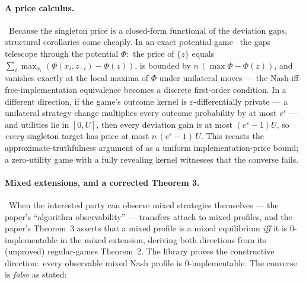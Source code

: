 
\paragraph{A price calculus.}\
Because the singleton price is a closed-form functional of the
deviation gaps, structural corollaries come cheaply.  In an exact
potential game~\citep{MondererShapley1996} the gaps telescope through
the potential $\Phi$:\ the price of $\{z\}$ equals
$\sum_i \max_{x_i} (\Phi(x_i,z_{-i}) - \Phi(z))$, is bounded by
$n\,(\max \Phi - \Phi(z))$, and vanishes exactly at the local maxima
of $\Phi$ under unilateral moves — the Nash-iff-free-implementation
equivalence becomes a discrete first-order condition.  In a different
direction, if the game's outcome kernel is
$\varepsilon$-differentially private — a unilateral strategy change
multiplies every outcome probability by at most $e^{\varepsilon}$ —
and utilities lie in $[0,U]$, then every deviation gain is at most
$(e^{\varepsilon}-1)U$, so \emph{every} singleton target has price at
most $n\,(e^{\varepsilon}-1)\,U$.  This recasts the
approximate-truthfulness argument of
\citet{McSherryTalwar2007} as a uniform implementation-price bound; a
zero-utility game with a fully revealing kernel witnesses that the
converse fails.


\paragraph{Mixed extensions, and a corrected Theorem 3.}\
When the interested party can observe mixed strategies themselves —
the paper's ``algorithm observability'' — transfers attach to mixed
profiles, and the paper's Theorem~3 asserts that a mixed profile is a
mixed equilibrium \emph{iff} it is 0-implementable in the mixed
extension, deriving both directions from its (unproved) regular-games
Theorem~2.  The library proves the constructive direction:\ every
observable mixed Nash profile is 0-implementable.  The converse is
\emph{false} as stated:

